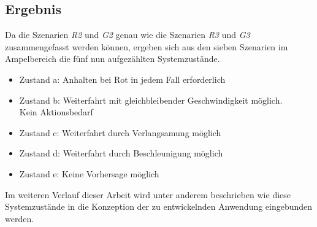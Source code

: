 \subsection*{Ergebnis}
Da die Szenarien \textit{R2} und \textit{G2} genau wie die Szenarien \textit{R3} und \textit{G3} zusammengefasst werden können, ergeben sich aus den sieben Szenarien im Ampelbereich die fünf nun aufgezählten Systemzustände.
\begin{itemize}
	\item Zustand a: Anhalten bei Rot in jedem Fall erforderlich
	\item Zustand b: Weiterfahrt mit gleichbleibender Geschwindigkeit möglich.\\ Kein Aktionsbedarf
	\item Zustand c: Weiterfahrt durch Verlangsamung möglich
	\item Zustand d: Weiterfahrt durch Beschleunigung möglich
	\item Zustand e: Keine Vorhersage möglich
\end{itemize}
Im weiteren Verlauf dieser Arbeit wird unter anderem beschrieben wie diese Systemzustände in die Konzeption der zu entwickelnden Anwendung eingebunden werden.
